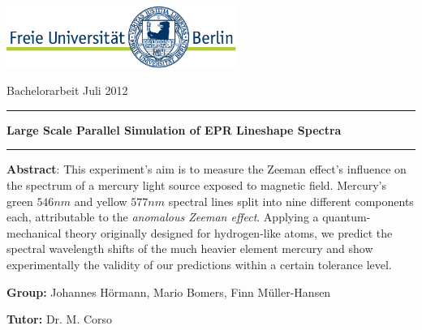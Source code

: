 \documentclass[11.5pt,a4paper]{article}
\begin{document}
\setlength{\parindent}{0pt} %


\thispagestyle{empty}

\includegraphics[height=2cm]{FULogo.jpg}
\hfill %
\parbox[b]{0.5\textwidth}{{\large Bachelorarbeit Juli 2012\\}}

\vspace{2cm}

\begin{center}

\rule[11pt]{15cm}{0.5pt}

{ \textbf {\Large Large Scale Parallel Simulation of EPR Lineshape Spectra}}

\rule{15cm}{0.5pt}

\vspace{1cm}

\parbox{15cm}{\small
\textbf{Abstract}: This experiment's aim is to measure the Zeeman effect's influence on the spectrum of a mercury light source exposed to magnetic field. Mercury's green $546nm$ and yellow $577nm$  spectral lines split into nine different components each, attributable to the \emph{anomalous Zeeman effect}. Applying a quantum-mechanical theory originally designed for hydrogen-like atoms, we predict the spectral wavelength shifts of the much heavier element mercury and show experimentally the validity of our predictions within a certain tolerance level. }

\vspace{0.5cm}

\end{center}

\vspace{1cm}

\large{

{\bf Group:}  Johannes H\"ormann, Mario Bomers, Finn M\"uller-Hansen}
\vspace{0.3cm}

{\bf Tutor:} Dr. M. Corso

\vspace{1cm}
\end{document}
